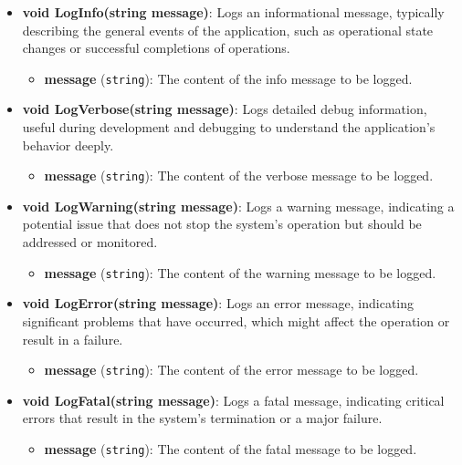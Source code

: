 \documentclass[12pt]{article}
\begin{document}
\begin{itemize}
    \item \textbf{void LogInfo(string message)}: Logs an informational message, typically describing the general events of the application, such as operational state changes or successful completions of operations.
        \begin{itemize}
            \item \textbf{message} (\texttt{string}): The content of the info message to be logged.
        \end{itemize}

    \item \textbf{void LogVerbose(string message)}: Logs detailed debug information, useful during development and debugging to understand the application's behavior deeply.
        \begin{itemize}
            \item \textbf{message} (\texttt{string}): The content of the verbose message to be logged.
        \end{itemize}

    \item \textbf{void LogWarning(string message)}: Logs a warning message, indicating a potential issue that does not stop the system's operation but should be addressed or monitored.
        \begin{itemize}
            \item \textbf{message} (\texttt{string}): The content of the warning message to be logged.
        \end{itemize}

    \item \textbf{void LogError(string message)}: Logs an error message, indicating significant problems that have occurred, which might affect the operation or result in a failure.
        \begin{itemize}
            \item \textbf{message} (\texttt{string}): The content of the error message to be logged.
        \end{itemize}

    \item \textbf{void LogFatal(string message)}: Logs a fatal message, indicating critical errors that result in the system's termination or a major failure.
        \begin{itemize}
            \item \textbf{message} (\texttt{string}): The content of the fatal message to be logged.
        \end{itemize}
\end{itemize}
\end{document}
